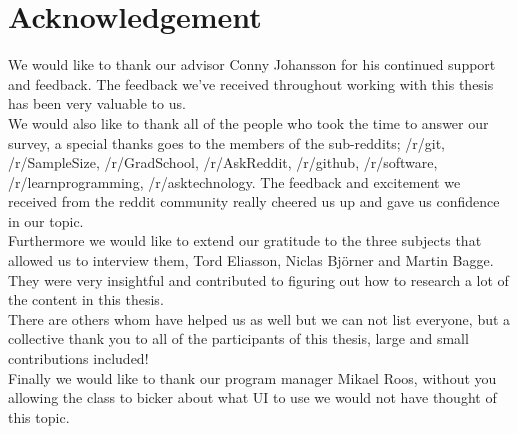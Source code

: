 \documentclass[a4paper,oneside]{bth} %
\begin{document}
		\chapter*{Acknowledgement}
		We would like to thank our advisor Conny Johansson for his continued support and feedback. The feedback we've received throughout working with this thesis has been very valuable to us.\\
		We would also like to thank all of the people who took the time to answer our survey, a special thanks goes to the members of the sub-reddits; /r/git, /r/SampleSize, /r/GradSchool, /r/AskReddit, /r/github, /r/software, /r/learnprogramming, /r/asktechnology. The feedback and excitement we received from the reddit community really cheered us up and gave us confidence in our topic. \\
		Furthermore we would like to extend our gratitude to the three subjects that allowed us to interview them, Tord Eliasson, Niclas Björner and Martin Bagge. They were very insightful and contributed to figuring out how to research a lot of the content in this thesis. \\
		There are others whom have helped us as well but we can not list everyone, but a collective thank you to all of the participants  of this thesis, large and small contributions included!\\
		Finally we would like to thank our program manager Mikael Roos, without you allowing the class to bicker about what UI to use we would not have thought of this topic. 
		
\end{document}
